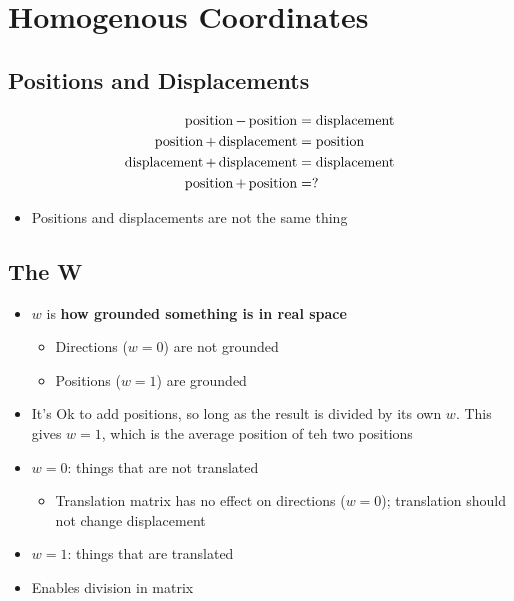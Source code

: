 \chapter{Homogenous Coordinates}

\section{Positions and Displacements}

  \begin{align}
    \operatorname{position} - \operatorname{position} &= \operatorname{displacement} \\
    \operatorname{position} + \operatorname{displacement} &= \operatorname{position} \\
    \operatorname{displacement} + \operatorname{displacement} &= \operatorname{displacement} \\
    \operatorname{position} + \operatorname{position} &= ?
  \end{align}

  \begin{itemize}
    \item Positions and displacements are not the same thing
  \end{itemize}

\section{The W}

  \begin{itemize}
    \item $ w $ is \textbf{how grounded something is in real space}
    \begin{itemize}
      \item Directions ($ w = 0 $) are not grounded
      \item Positions ($ w = 1 $) are grounded
    \end{itemize}

    \item It's Ok to add positions, so long as the result is divided by its
    own $ w $. This gives $ w = 1 $, which is the average position of teh two
    positions

    \item $ w = 0 $: things that are not translated
    \begin{itemize}
      \item Translation matrix has no effect on directions ($ w = 0 $);
      translation should not change displacement
    \end{itemize}

    \item $ w = 1 $: things that are translated
    \item Enables division in matrix
  \end{itemize}

